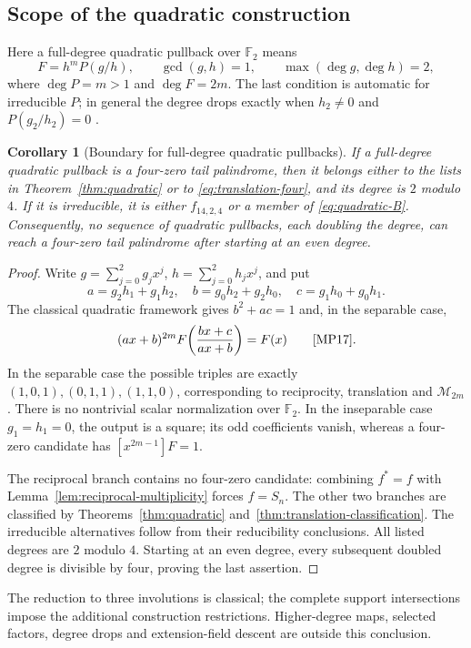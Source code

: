 \documentclass[11pt]{article}
\newtheorem{corollary}[proposition]{Corollary}
\theoremstyle{definition}
\theoremstyle{remark}
\begin{document}
\subsection{Scope of the quadratic construction}\label{sec:quadratic-scope}
Here a full-degree quadratic pullback over $\mathbb F_2$ means
\[
 F=h^mP(g/h),\qquad \gcd(g,h)=1,\qquad
 \max(\deg g,\deg h)=2,
\]
where $\deg P=m>1$ and $\deg F=2m$.
The last condition is automatic for irreducible
$P$; in general the degree drops exactly when $h_2\ne0$ and
$P(g_2/h_2)=0$ \cite[Section 2]{MP17}.

\begin{corollary}[Boundary for full-degree quadratic pullbacks]
\label{cor:all-quadratic}
If a full-degree quadratic pullback is a four-zero tail palindrome,
then it belongs either to the lists in Theorem~\ref{thm:quadratic}
or to \eqref{eq:translation-four}, and its degree is $2$ modulo $4$.
If it is irreducible, it is either $f_{14,2,4}$ or a member of
\eqref{eq:quadratic-B}. Consequently, no sequence of quadratic
pullbacks, each doubling the degree, can reach a four-zero tail
palindrome after starting at an even degree.
\end{corollary}
\begin{proof}
Write $g=\sum_{j=0}^2g_jx^j$, $h=\sum_{j=0}^2h_jx^j$, and put
\[
 a=g_2h_1+g_1h_2,\quad b=g_0h_2+g_2h_0,\quad
 c=g_1h_0+g_0h_1.
\]
The classical quadratic framework gives $b^2+ac=1$ and, in the
separable case,
\[
 (ax+b)^{2m}F\!\left(\frac{bx+c}{ax+b}\right)=F(x)
 \qquad\text{\cite[Section 4, Lemma 9]{MP17}}.
\]
In the separable case the possible triples are exactly $(1,0,1),(0,1,1),(1,1,0)$,
corresponding to reciprocity, translation and $\mathcal M_{2m}$.
There is no nontrivial scalar normalization over $\mathbb F_2$.
In the inseparable case $g_1=h_1=0$, the output is a square;
its odd coefficients vanish, whereas a four-zero candidate has
$[x^{2m-1}]F=1$.

The reciprocal branch contains no four-zero candidate: combining
$f^*=f$ with Lemma~\ref{lem:reciprocal-multiplicity} forces
$f=S_n$. The other two branches are classified by
Theorems~\ref{thm:quadratic} and~\ref{thm:translation-classification}.
The irreducible alternatives follow from their reducibility
conclusions. All listed degrees are $2$ modulo $4$.
Starting at an even degree, every subsequent doubled degree is
divisible by four, proving the last assertion.
\end{proof}

The reduction to three involutions is classical; the complete support
intersections impose the additional construction restrictions.
Higher-degree maps, selected factors, degree drops and extension-field
descent are outside this conclusion.
\end{document}
